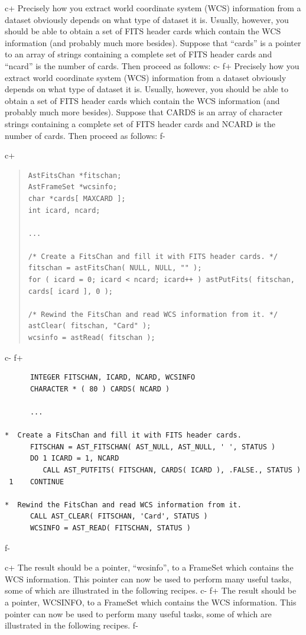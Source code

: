 \documentclass[twoside,11pt]{article}
\begin{document}
c+
Precisely how you extract world coordinate system (WCS) information
from a dataset obviously depends on what type of dataset it
is. Usually, however, you should be able to obtain a set of FITS
header cards which contain the WCS information (and probably much more
besides). Suppose that ``cards'' is a pointer to an array of strings
containing a complete set of FITS header cards and ``ncard'' is the
number of cards. Then proceed as follows:
c-
f+
Precisely how you extract world coordinate system (WCS) information
from a dataset obviously depends on what type of dataset it
is. Usually, however, you should be able to obtain a set of FITS
header cards which contain the WCS information (and probably much more
besides). Suppose that CARDS is an array of character strings
containing a complete set of FITS header cards and NCARD is the number
of cards. Then proceed as follows:
f-

c+
\begin{quote}
\small
\begin{verbatim}
AstFitsChan *fitschan;
AstFrameSet *wcsinfo;
char *cards[ MAXCARD ];
int icard, ncard;

...

/* Create a FitsChan and fill it with FITS header cards. */
fitschan = astFitsChan( NULL, NULL, "" );
for ( icard = 0; icard < ncard; icard++ ) astPutFits( fitschan, cards[ icard ], 0 );

/* Rewind the FitsChan and read WCS information from it. */
astClear( fitschan, "Card" );
wcsinfo = astRead( fitschan );
\end{verbatim}
\normalsize
\end{quote}
c-
f+
\small
\begin{verbatim}
      INTEGER FITSCHAN, ICARD, NCARD, WCSINFO
      CHARACTER * ( 80 ) CARDS( NCARD )

      ...

*  Create a FitsChan and fill it with FITS header cards.
      FITSCHAN = AST_FITSCHAN( AST_NULL, AST_NULL, ' ', STATUS )
      DO 1 ICARD = 1, NCARD
         CALL AST_PUTFITS( FITSCHAN, CARDS( ICARD ), .FALSE., STATUS )
 1    CONTINUE

*  Rewind the FitsChan and read WCS information from it.
      CALL AST_CLEAR( FITSCHAN, 'Card', STATUS )
      WCSINFO = AST_READ( FITSCHAN, STATUS )
\end{verbatim}
\normalsize
f-

c+
The result should be a pointer, ``wcsinfo'', to a FrameSet which
contains the WCS information. This pointer can now be used to perform
many useful tasks, some of which are illustrated in the following
recipes.
c-
f+
The result should be a pointer, WCSINFO, to a FrameSet which contains
the WCS information. This pointer can now be used to perform many
useful tasks, some of which are illustrated in the following recipes.
f-
\end{document}
